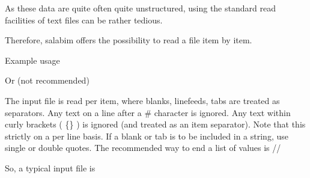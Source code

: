\documentclass[letterpaper,10pt,english]{sphinxmanual}
\begin{document}
As these data are quite often quite unstructured, using the standard read facilities of text files can be rather tedious.

Therefore, salabim offers the possibility to read a file item by item.

Example usage

\begin{sphinxVerbatim}[commandchars=\\\{\}]
   
      
      
\end{sphinxVerbatim}

Or (not recommended)

\begin{sphinxVerbatim}[commandchars=\\\{\}]
  
  
  
\end{sphinxVerbatim}

The input file is read per item, where blanks, linefeeds, tabs are treated as separators. 
Any text on a line after a \# character is ignored. 
Any text within curly brackets ( \{\} ) is ignored (and treated as an item separator). 
Note that this strictly on a per line basis. 
If a blank or tab is to be included in a string, use single or double quotes.  
The recommended way to end a list of values is //

So, a typical input file is
\end{document}
